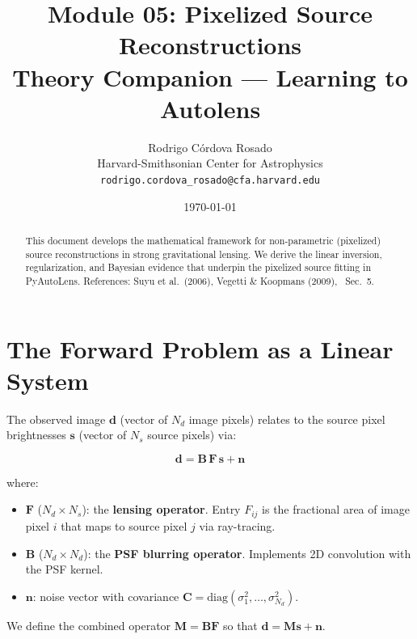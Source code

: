 \documentclass[11pt, letterpaper]{article}
\title{\textbf{Module 05: Pixelized Source Reconstructions}\\[0.5em]
\large Theory Companion --- Learning to Autolens}
\author{Rodrigo C\'ordova Rosado\\
\small Harvard-Smithsonian Center for Astrophysics\\
\small \texttt{rodrigo.cordova\_rosado@cfa.harvard.edu}}
\date{\today}
\begin{document}
\maketitle

\begin{abstract}
This document develops the mathematical framework for non-parametric
(pixelized) source reconstructions in strong gravitational lensing.
We derive the linear inversion, regularization, and Bayesian evidence
that underpin the pixelized source fitting in PyAutoLens.
References: Suyu et al.\ (2006), Vegetti \& Koopmans (2009),
\Night\ Sec.~5.
\end{abstract}

\tableofcontents
\newpage

\section{The Forward Problem as a Linear System}
\label{sec:linear-system}

The observed image $\mathbf{d}$ (vector of $N_d$ image pixels) relates
to the source pixel brightnesses $\mathbf{s}$ (vector of $N_s$ source
pixels) via:

\begin{keyresult}
\begin{equation}
\mathbf{d} = \mathbf{B}\,\mathbf{F}\,\mathbf{s} + \mathbf{n}
\label{eq:linear-forward}
\end{equation}
\end{keyresult}

\noindent where:
\begin{itemize}[nosep]
  \item $\mathbf{F}$ ($N_d \times N_s$): the \textbf{lensing operator}.
    Entry $F_{ij}$ is the fractional area of image pixel $i$ that maps
    to source pixel $j$ via ray-tracing.
  \item $\mathbf{B}$ ($N_d \times N_d$): the \textbf{PSF blurring operator}.
    Implements 2D convolution with the PSF kernel.
  \item $\mathbf{n}$: noise vector with covariance
    $\mathbf{C} = \mathrm{diag}(\sigma_1^2, \ldots, \sigma_{N_d}^2)$.
\end{itemize}

We define the combined operator $\mathbf{M} = \mathbf{B}\mathbf{F}$
so that $\mathbf{d} = \mathbf{M}\mathbf{s} + \mathbf{n}$.
\end{document}
